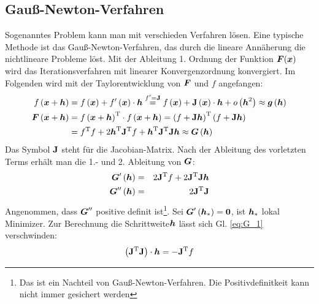 \subsection{Gauß-Newton-Verfahren}\label{Gauß-Newton-Verfahren}
Sogenanntes Problem kann man mit verschieden Verfahren lösen. Eine typische Methode ist das Gauß-Newton-Verfahren, das durch die lineare Annäherung die nichtlineare Probleme löst. Mit der Ableitung 1. Ordnung der Funktion $\boldsymbol F(\boldsymbol x)$ wird das Iterationsverfahren mit linearer Konvergenzordnung konvergiert. Im Folgenden wird mit der Taylorentwicklung von $\boldsymbol F$ und $f$ angefangen\cite{madsen2004methods}:
\begin{equation}
\begin{aligned}
f\left ( \boldsymbol x+\boldsymbol h \right ) &= f\left ( \boldsymbol x \right ) + f'\left ( \boldsymbol x \right )\cdot \boldsymbol h \overset{f' = \mathbf{J}}{=} f\left ( \boldsymbol x \right ) + \mathbf{J}\left ( \boldsymbol x \right )\cdot \boldsymbol h + o\left ( \boldsymbol h^{2} \right ) \approx \boldsymbol g\left ( \boldsymbol h \right )\\
\boldsymbol F\left ( \boldsymbol x+\boldsymbol h \right ) &= f\left ( \boldsymbol x+\boldsymbol h \right )^ \mathrm{ T }\cdot f\left ( \boldsymbol x+\boldsymbol h \right )=\left ( f+\mathbf{J}\boldsymbol h \right )^ \mathrm{ T }\left ( f+\mathbf{J}\boldsymbol h \right )\\ &= f^ \mathrm{ T }f+2\boldsymbol h^ \mathrm{ T }\mathbf{J}^ \mathrm{ T }f + \boldsymbol h^ \mathrm{ T }\mathbf{J}^ \mathrm{ T }\mathbf{J}\boldsymbol h \approx \boldsymbol G\left ( \boldsymbol h \right )
\end{aligned}
\end{equation}
Das Symbol $\mathbf{J}$ steht für die Jacobian-Matrix. Nach der Ableitung des vorletzten Terms erhält man die 1.- und 2. Ableitung von $\boldsymbol G$:
\begin{eqnarray}
\boldsymbol G'\left ( \boldsymbol h \right )  &=& 2\mathbf{J}^\mathrm{T}f + 2\mathbf{J}^\mathrm{T}\mathbf{J}\boldsymbol h\label{eq:G_1}\\
\boldsymbol G''\left ( \boldsymbol h \right ) &=& 2\mathbf{J}^\mathrm{T}\mathbf{J}\label{eq:G_2}
\end{eqnarray}
Angenommen, dass $\boldsymbol G''$ positive definit ist\footnote{Das ist ein Nachteil von Gauß-Newton-Verfahren. Die Positivdefinitkeit kann nicht immer gesichert werden}. Sei $\boldsymbol G'\left (\boldsymbol h_{\ast} \right ) = \boldsymbol 0$, ist $\boldsymbol h_{\ast}$ lokal Minimizer. Zur Berechnung die Schrittweite$\boldsymbol h$ lässt sich Gl. \ref{eq:G_1} verschwinden:
\begin{equation}
\left ( \mathbf{J}^\mathrm{T} \mathbf{J} \right ) \cdot \boldsymbol h  = -\mathbf{J}^\mathrm{T}f\label{eq:cal_NW_hs}
\end{equation}
